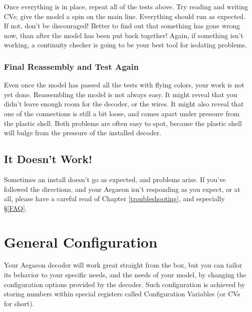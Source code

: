\documentclass[12pt,letterpaper,draft]{memoir} %
\begin{document}
Once everything is in place, repeat all of the tests above. Try reading and writing CVs; give the model a spin on the main line. Everything should run as expected. If not, don't be discouraged! Better to find out that something has gone wrong now, than after the model has been put back together! Again, if something isn't working, a continuity checker is going to be your best tool for isolating problems.

\subsection{Final Reassembly and Test Again}

Even once the model has passed all the tests with flying colors, your work is not yet done. Reassembling the model is not always easy. It might reveal that you didn't leave enough room for the decoder, or the wires. It might also reveal that one of the connections is still a bit loose, and comes apart under pressure from the plastic shell. Both problems are often easy to spot, because the plastic shell will bulge from the pressure of the installed decoder.

\section{It Doesn't Work!}

Sometimes an install doesn't go as expected, and problems arise. If you've followed the directions, and your Aegaeon isn't responding as you expect, or at all, please have a careful read of Chapter \ref{troubleshooting}, and especially \S\ref{FAQ}.

\chapter{General Configuration}
\label{generalconfiguration}
Your Aegaeon decoder will work great straight from the box, but you can tailor its behavior to your specific needs, and the needs of your model, by changing the configuration options provided by the decoder. Such configuration is achieved by storing numbers within special registers called Configuration Variables (or CVs for short).
\end{document}
